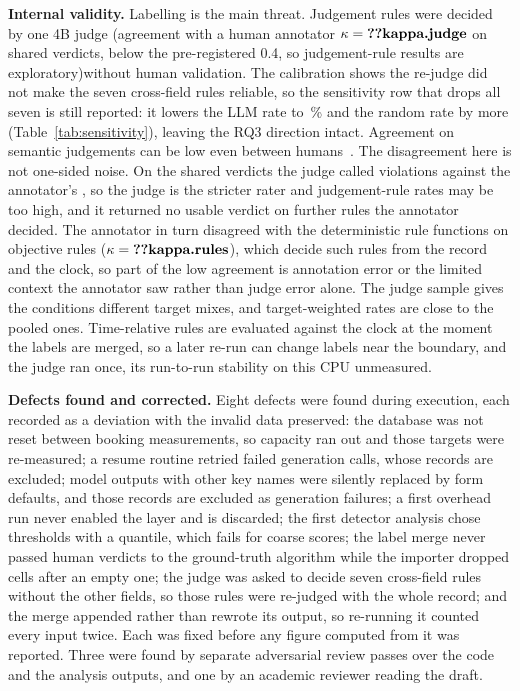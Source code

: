 \documentclass[journal]{IEEEtran}
\begin{document}
\textbf{Internal validity.} Labelling is the main threat. Judgement rules were decided by one 4B judge
\ifhumanlabels (agreement with a human annotator $\kappa=\R{kappa.judge}$ on  shared
verdicts, below the pre-registered 0.4, so judgement-rule results are exploratory)\else without human
validation\fi. The calibration shows the re-judge did not make the seven cross-field rules reliable, so the
sensitivity row that drops all seven is still reported: it lowers the LLM rate to
\,\% and the random rate by more (Table~\ref{tab:sensitivity}), leaving the RQ3
direction intact. Agreement on semantic judgements can be low even between
humans~\cite{calo2026semanticgap}.\ifhumanlabels{} The disagreement here is not
one-sided noise. On the shared verdicts the judge called  violations against the
annotator's , so the judge is the stricter rater and judgement-rule rates may be
too high, and it returned no usable verdict on  further rules the annotator decided.
The annotator in turn disagreed with the deterministic rule functions on objective rules
($\kappa=\R{kappa.rules}$), which decide such rules from the record and the clock, so part of the low
agreement is annotation error or the limited context the annotator saw rather than judge error
alone.\fi{} The judge sample gives the conditions different target mixes, and target-weighted rates
are close to the pooled ones.
Time-relative rules are evaluated against the clock at the moment the labels are merged, so a later
re-run can change labels near the boundary, and the judge ran once, its run-to-run stability on this
CPU unmeasured.

\textbf{Defects found and corrected.} Eight defects were found during execution, each recorded as a
deviation with the invalid data preserved: the database was not reset between booking measurements, so
capacity ran out and those targets were re-measured; a resume routine retried failed generation calls,
whose records are excluded; model outputs with other key names were silently replaced by form
defaults, and those records are excluded as generation failures; a first overhead run never enabled
the layer and is discarded; the first detector analysis chose thresholds with a quantile, which fails
for coarse scores; the label merge never passed human verdicts to the ground-truth algorithm while the
importer dropped cells after an empty one; the judge was asked to decide seven cross-field rules
without the other fields, so those rules were re-judged with the whole record; and the merge appended
rather than rewrote its output, so re-running it counted every input twice. Each was fixed before any
figure computed from it was reported. Three were found by separate adversarial review passes over the
code and the analysis outputs, and one by an academic reviewer reading the draft.
\end{document}
